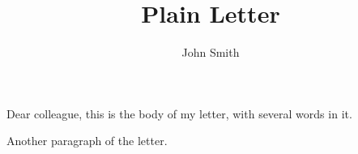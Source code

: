 \documentclass{article}
\title{Plain Letter}\author{John Smith}
\begin{document}
\begin{flushleft}
Dear colleague, this is the body of my letter, with several words in it.

Another paragraph of the letter.
\end{flushleft}
\noindent\@author
\end{document}
